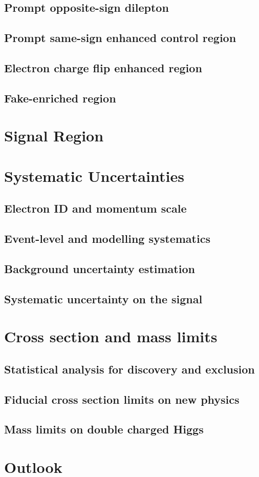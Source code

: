 \subsection{Prompt opposite-sign dilepton}
\subsection{Prompt same-sign enhanced control region}
\subsection{Electron charge flip enhanced region}
\subsection{Fake-enriched region}

\section{Signal Region}
\label{sec:wprimeSignalRegion}

\section{Systematic Uncertainties}
\label{sec:wprimeSystematics}
\subsection{Electron ID and momentum scale}
\subsection{Event-level and modelling systematics}
\subsection{Background uncertainty estimation}
\subsection{Systematic uncertainty on the signal}

\section{Cross section and mass limits}
\subsection{Statistical analysis for discovery and exclusion}
\subsection{Fiducial cross section limits on new physics}
\subsection{Mass limits on double charged Higgs}

\section{Outlook}
\label{sec:wprimeConclusion}

